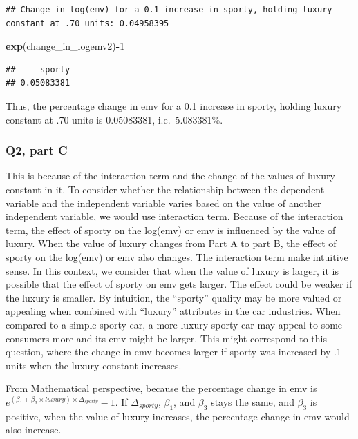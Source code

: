 \documentclass[
]{article}
\newenvironment{Shaded}{\begin{snugshade}}{\end{snugshade}}
\newcommand{\DecValTok}[1]{\textcolor[rgb]{0.00,0.00,0.81}{#1}}
\newcommand{\FunctionTok}[1]{\textcolor[rgb]{0.13,0.29,0.53}{\textbf{#1}}}
\newcommand{\NormalTok}[1]{#1}
\newcommand{\SpecialCharTok}[1]{\textcolor[rgb]{0.81,0.36,0.00}{\textbf{#1}}}
\begin{document}
\begin{verbatim}
## Change in log(emv) for a 0.1 increase in sporty, holding luxury constant at .70 units: 0.04958395
\end{verbatim}

\begin{Shaded}
\begin{Highlighting}[]
\FunctionTok{exp}\NormalTok{(change\_in\_logemv2)}\SpecialCharTok{{-}}\DecValTok{1}
\end{Highlighting}
\end{Shaded}

\begin{verbatim}
##     sporty 
## 0.05083381
\end{verbatim}

Thus, the percentage change in emv for a 0.1 increase in sporty, holding
luxury constant at .70 units is 0.05083381, i.e.~5.083381\%.

\subsubsection{Q2, part C}\label{q2-part-c}

This is because of the interaction term and the change of the values of
luxury constant in it. To consider whether the relationship between the
dependent variable and the independent variable varies based on the
value of another independent variable, we would use interaction term.
Because of the interaction term, the effect of sporty on the log(emv) or
emv is influenced by the value of luxury. When the value of luxury
changes from Part A to part B, the effect of sporty on the log(emv) or
emv also changes. The interaction term make intuitive sense. In this
context, we consider that when the value of luxury is larger, it is
possible that the effect of sporty on emv gets larger. The effect could
be weaker if the luxury is smaller. By intuition, the ``sporty'' quality
may be more valued or appealing when combined with ``luxury'' attributes
in the car industries. When compared to a simple sporty car, a more
luxury sporty car may appeal to some consumers more and its emv might be
larger. This might correspond to this question, where the change in emv
becomes larger if sporty was increased by .1 units when the luxury
constant increases.

From Mathematical perspective, because the percentage change in emv is
\(e^{(\beta_1+\beta_3 \times luxury) \times \Delta_{sporty}}-1\). If
\(\Delta_{sporty}\), \(\beta_1\), and \(\beta_3\) stays the same, and
\(\beta_3\) is positive, when the value of luxury increases, the
percentage change in emv would also increase.
\end{document}
